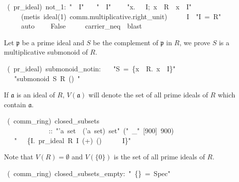 \documentclass[12pt]{scrartcl}
\begin{document}
\begin{isabelle}
\ (\ pr\_ideal)\ not\_1:\ "\isasymone \ \isasymnotin \ I"\isanewline
{}\isanewline
\ \ \ "\isasymone \ \isasymin \ I"\isanewline
\ \ \ \ "\isasymAnd x.\ \isasymlbrakk \isasymone \ \isasymin \ I;\ x\ \isasymin \ R\isasymrbrakk \ \isasymLongrightarrow \ x\ \isasymin \ I"\isanewline
\ \ \ \ \ (metis\ ideal(1)\ comm.multiplicative.right\_unit)\isanewline
\ \ \ \isacartoucheopen \isasymone \ \isasymin \ I\isacartoucheclose \ \ "I\ =\ R"\isanewline
\ \ \ \ \ auto\isanewline
\ \ \ \ False\isanewline
\ \ \ \ \ carrier\_neq\ \ blast\isanewline
{}
\end{isabelle}

Let $\mathfrak{p}$ be a prime ideal and $S$ be the complement of $\mathfrak{p}$ in $R$,  we prove $S$ is a multiplicative submonoid of $R$.

\begin{isabelle}
\ (\ pr\_ideal)\ submonoid\_notin:\isanewline
\ \ \ "S\ =\ \{x\ \isasymin \ R.\ x\ \isasymnotin \ I\}"\isanewline
\ \ \ "submonoid\ S\ R\ (\isasymcdot )\ \isasymone "
\end{isabelle}

If $\mathfrak{a}$ is an ideal of $R$, $V(\mathfrak{a})$ will denote the set of all prime ideals of $R$ which contain $\mathfrak{a}$. 

\begin{isabelle}
\ (\ comm\_ring)\ closed\_subsets\isanewline
\ \ \ \ \ \ \ \ \ \ \ \ \ ::\ "'a\ set\ \isasymRightarrow \ ('a\ set)\ set"\ ("\isasymV \ \_"\ [900]\ 900)\isanewline
\ \ \ "\isasymV \ \isasymaa \ \isasymequiv \ \{I.\ pr\_ideal\ R\ I\ (+)\ (\isasymcdot )\ \isasymzero \ \isasymone \ \isasymand \ \isasymaa \ \isasymsubseteq \ I\}"
\end{isabelle}

Note that $V(R) = \emptyset$ and $V(\lbrace 0 \rbrace)$ is the set of all prime ideals of $R$.

\begin{isabelle}
\ (\ comm\_ring)\ closed\_subsets\_empty:\ "\isasymV \ \{\}\ =\ Spec"
\end{isabelle}
\end{document}
